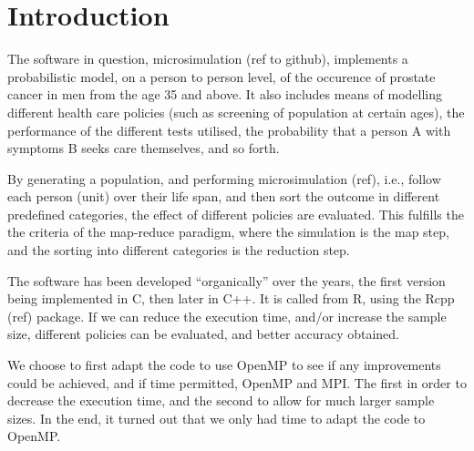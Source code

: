 \section{Introduction}

The software in question, microsimulation (ref to github), implements
a probabilistic model, on a person to person level, of the occurence
of prostate cancer in men from the age 35 and above. It also includes
means of modelling different health care policies (such as screening
of population at certain ages), the performance of the different tests
utilised, the probability that a person A with symptoms B seeks care
themselves, and so forth.

By generating a population, and performing microsimulation (ref),
i.e., follow each person (unit) over their life span, and then sort
the outcome in different predefined categories, the effect of
different policies are evaluated. This fulfills the the criteria of
the map-reduce paradigm, where the simulation is the map step, and the
sorting into different categories is the reduction step.

The software has been developed ``organically'' over the years, the
first version being implemented in C, then later in C++. It is called
from R, using the Rcpp (ref) package. If we can reduce the execution
time, and/or increase the sample size, different policies can be
evaluated, and better accuracy obtained.

We choose to first adapt the code to use OpenMP to see if any
improvements could be achieved, and if time permitted, OpenMP and
MPI. The first in order to decrease the execution time, and the second
to allow for much larger sample sizes. In the end, it turned out that
we only had time to adapt the code to OpenMP.







